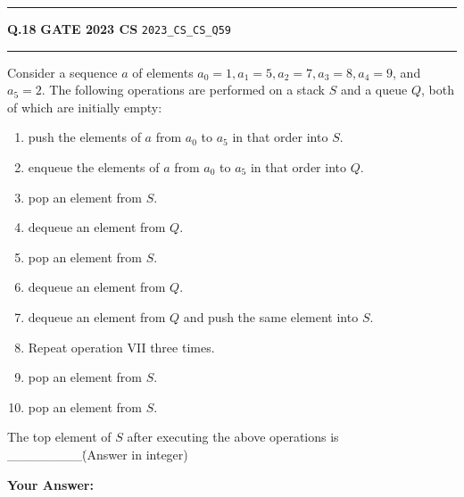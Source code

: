 \documentclass[a4paper,10pt]{article}
\begin{document}
\vspace{6pt}\hrule height 0.35pt\vspace{6pt}
\noindent
\begin{tcolorbox}[
    blanker,
    sidebyside,
    sidebyside align=top,
    lefthand width=0.55\textwidth,
    top=4pt, bottom=4pt, left=0pt, right=0pt,
    middle=16pt,
    underlay={
        \draw[dashed, black!80, line width=0.8pt, dash pattern=on 4pt off 3pt]
            ([xshift=0.55\textwidth+8pt]frame.north west) --
            ([xshift=0.55\textwidth+8pt]frame.south west);
    }
]
\textbf{Q.18}  \hfill {\footnotesize\textbf{GATE 2023 CS} \quad \tiny\texttt{2023\_CS\_CS\_Q59}}
\vspace{2pt}\hrule height 0.3pt\vspace{4pt}

Consider a sequence $a$ of elements $a_0 = 1, a_1 = 5, a_2 = 7, a_3 = 8, a_4 = 9$, and $a_5 = 2$. The following operations are performed on a stack $S$ and a queue $Q$, both of which are initially empty:
\begin{enumerate}[label=\Roman*.,itemsep=0pt,topsep=2pt]
\item push the elements of $a$ from $a_0$ to $a_5$ in that order into $S$.
\item enqueue the elements of $a$ from $a_0$ to $a_5$ in that order into $Q$.
\item pop an element from $S$.
\item dequeue an element from $Q$.
\item pop an element from $S$.
\item dequeue an element from $Q$.
\item dequeue an element from $Q$ and push the same element into $S$.
\item Repeat operation VII three times.
\item pop an element from $S$.
\item pop an element from $S$.
\end{enumerate}
The top element of $S$ after executing the above operations is \_\_\_\_\_\_\_\_\. (Answer in integer)

\par\vspace{6pt}\noindent\textbf{Your Answer:} \fbox{\rule{0pt}{1.3ex}\hspace{3cm}}

\tcblower


\end{tcolorbox}
\end{document}

